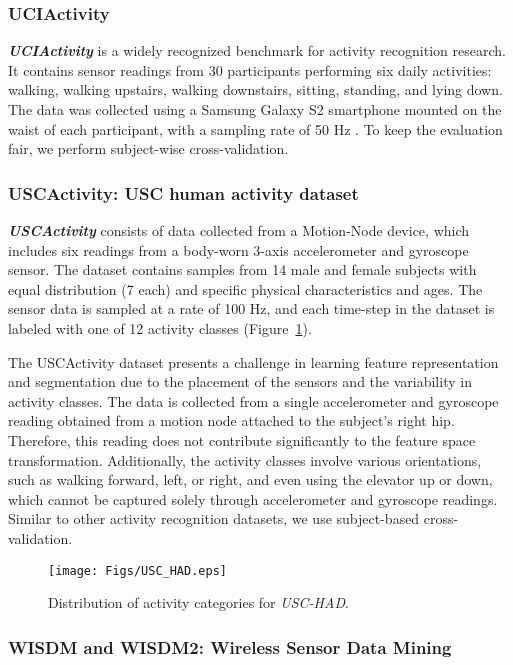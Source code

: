 \documentclass[twoside,11pt,preprint]{article}
\begin{document}
\subsubsection{UCIActivity}
\textbf{\textit{UCIActivity}} is a widely recognized benchmark for activity recognition research. It contains sensor readings from 30 participants performing six daily activities: walking, walking upstairs, walking downstairs, sitting, standing, and lying down. The data was collected using a Samsung Galaxy S2 smartphone mounted on the waist of each participant, with a sampling rate of 50 Hz \cite{UCI-HAR}. To keep the evaluation fair, we perform subject-wise cross-validation.

\subsubsection{USCActivity: USC human activity dataset}

\textbf{\textit{USCActivity}} \citep{USC-HAD2012} consists of data collected from a Motion-Node device, which includes six readings from a body-worn 3-axis accelerometer and gyroscope sensor. The dataset contains samples from 14 male and female subjects with equal distribution (7 each) and specific physical characteristics and ages. The sensor data is sampled at a rate of 100 Hz, and each time-step in the dataset is labeled with one of 12 activity classes (Figure~\ref{fig:distrib_USC}).

The USCActivity dataset presents a challenge in learning feature representation and segmentation due to the placement of the sensors and the variability in activity classes. The data is collected from a single accelerometer and gyroscope reading obtained from a motion node attached to the subject's right hip. Therefore, this reading does not contribute significantly to the feature space transformation. Additionally, the activity classes involve various orientations, such as walking forward, left, or right, and even using the elevator up or down, which cannot be captured solely through accelerometer and gyroscope readings. Similar to other activity recognition datasets, we use subject-based cross-validation.
\begin{figure}
\centering
     \texttt{[image: Figs/USC\_HAD.eps]}
     \caption{Distribution of activity categories for \textit{USC-HAD}.}
     \label{fig:distrib_USC}
\end{figure}

\subsubsection{WISDM and WISDM2: Wireless Sensor Data Mining}
\end{document}
